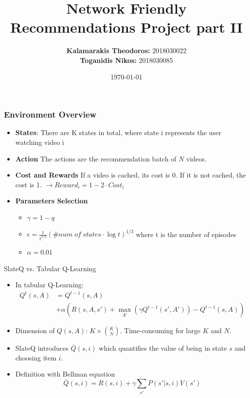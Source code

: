 \documentclass{beamer}
\title{Network Friendly Recommendations Project part II}
\author{{\bf Kalamarakis Theodoros:} 2018030022\\
{\bf Toganidis Nikos:} 2018030085}
\date{\today}
\begin{document}
\frame{\titlepage}


\begin{frame}
\frametitle{Environment Overview}
\begin{itemize}
    \item {\bf States}: There are K states in total, where state i represents the user watching video i
    \item {\bf Action} The actions are the recommendation batch of $N$ videos.
    
    \item {\bf Cost and Rewards}  If a video is cached, its cost is 0. If it is not cached, the cost is 1. $\rightarrow Reward_i = 1- 2\cdot Cost_i$ 

    \item {\bf Parameters Selection} 
    \begin{itemize}
        \item $\gamma = 1-q$\\
        \setlength\itemsep{10pt}
        \item $\epsilon = \frac{1}{t^{1/3}}(\#num \;of \;states\cdot \log t )^{1/3} $  where t is the number of episodes\\
        \setlength\itemsep{10pt}
        \item $\alpha = 0.01$
    \end{itemize}
   
\end{itemize}
\end{frame}


   
        
            \begin{frame}{SlateQ vs. Tabular Q-Learning}
                \begin{itemize}
                    \item In tabular Q-Learning:
                    \begin{align*}
                    Q^t(s,A) &= Q^{t-1}(s,A)\\
                    & + \alpha\left(R(s,A,s') + \max_{A'}\left(\gamma Q^{t-1}(s',A')\right) - Q^{t-1}(s,A)\right)
                    \end{align*}
                    \pause
                    \item Dimension of $Q(s,A)$: $K\times {K \choose N}$. Time-consuming for large $K$ and $N$.
                    \pause
                    \item SlateQ introduces $\bar{Q}(s,i)$ which quantifies the value of being in state $s$ and choosing item $i$. 
                    \pause
                    \item Definition with Bellman equation
                        $$\bar{Q}(s,i) = R(s,i)+ \gamma\sum_{s'}P(s'|s,i)V(s')$$
                \end{itemize}
                \end{frame}
    
\end{document}
